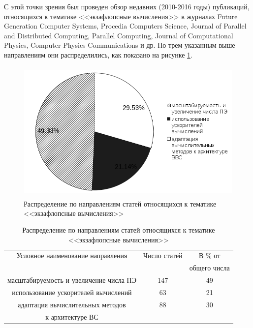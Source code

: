 С этой точки зрения был проведен обзор недавних (2010-2016 годы) публикаций, относящихся к тематике <<экзафлопсные вычисления>> в журналах Future Generation Computer Systems, Procedia Computers Science, Journal of Parallel and Distributed Computing, Parallel Computing, Journal of Computational Physics, Computer Physics Communications и др.
По трем указанным выше направлениям они распределились, как показано на рисунке \ref{exaflops_topics_fig}.


 	\begin{figure}[htb]
 		 \begin{center}
 		\includegraphics[height=7cm,keepaspectratio]{images/exaflops_topics_15.png}
 		\caption{Распределение по направлениям статей относящихся к тематике <<экзафлопсные вычисления>>}
 		\label{exaflops_topics_fig}
 		 \end{center}
 	\end{figure}




\begin{table}[ht]
\caption{Распределение по направлениям статей относящихся к тематике <<экзафлопсные вычисления>>}
\begin{center}
\begin{tabular}{|c|c|c|}
\hline
Условное наименование направления      & Число статей & В \%  от     \\
                                       &              & общего числа \\ \hline
масштабируемость и увеличение числа ПЭ & 147 &          49 \\  \hline
использование ускорителей вычислений   & 63  &          21 \\  \hline
адаптация вычислительных методов       & 88  &          30  \\ 
к архитектуре ВС                       &     &              \\ \hline  
\end{tabular}
\end{center}
\label{exaflops_topics_tab}
\end{table}

